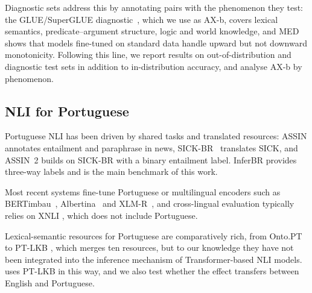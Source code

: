Diagnostic sets address this by annotating pairs with the phenomenon they test: the GLUE/SuperGLUE
diagnostic~\citep{wang2018glue,wang2019superglue}, which we use as AX-b, covers lexical semantics,
predicate--argument structure, logic and world knowledge, and MED~\citep{yanaka2019can} shows that models
fine-tuned on standard data handle upward but not downward monotonicity. Following this line, we report
results on out-of-distribution and diagnostic test sets in addition to in-distribution accuracy, and
analyse AX-b by phenomenon.

\subsection{NLI for Portuguese}
\label{sec:rw-portuguese}

Portuguese NLI has been driven by shared tasks and translated resources: ASSIN \citep{fonseca2016assin}
annotates entailment and paraphrase in news, SICK-BR~\citep{real2018sickbr} translates SICK, and ASSIN~2
\citep{real2020assin2} builds on SICK-BR with a binary entailment label. InferBR \citep{bencke2024inferbr} provides
three-way labels and is the main benchmark of this work.

Most recent systems fine-tune Portuguese or
multilingual encoders such as BERTimbau~\citep{souza2020bertimbau}, Albertina~\citep{rodrigues2023albertina}
and XLM-R~\citep{conneau2020unsupervised}, and cross-lingual evaluation typically relies on XNLI
\citep{conneau2018xnli}, which does not include Portuguese.

Lexical-semantic resources for Portuguese
are comparatively rich, from Onto.PT~\citep{goncalooliveira2014ontopt} to PT-LKB
\citep{goncalooliveira2018ptlkb}, which merges ten resources, but to our knowledge they have not been
integrated into the inference mechanism of Transformer-based NLI models.  \model{} uses PT-LKB in this way, and we also test whether the effect
transfers between English and Portuguese.

